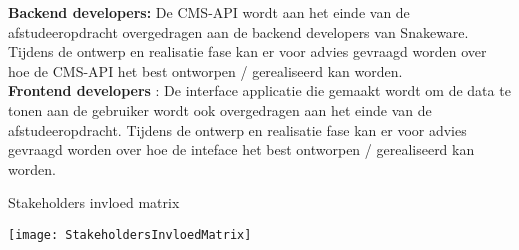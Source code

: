 \whitespace
\textbf{Backend developers:} De \gls{CMS}-API wordt aan het einde van de afstudeeropdracht overgedragen aan de backend developers van Snakeware.
Tijdens de ontwerp en realisatie fase kan er voor advies gevraagd worden over hoe de \gls{CMS}-API het best ontworpen / gerealiseerd kan worden. \\
\textbf{Frontend developers} : De interface applicatie die gemaakt wordt om de data te tonen aan de gebruiker wordt ook overgedragen aan het einde van de afstudeeropdracht.
Tijdens de ontwerp en realisatie fase kan er voor advies gevraagd worden over hoe de inteface het best ontworpen / gerealiseerd kan worden.

\whitespace
\begin{graphic}
    \captionsetup{type=figure}
    \caption{Stakeholders invloed matrix}
    \texttt{[image: StakeholdersInvloedMatrix]}
    \label{fig:StakeholdersInvloedMatrix}
\end{graphic}

